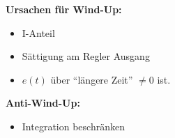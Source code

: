   \begin{multicols}{2}
    \textbf{Ursachen für Wind-Up:}
    \begin{itemize}[leftmargin=*]
      \item I-Anteil
      \item Sättigung am Regler Ausgang
      \item $e(t)$ über "`längere Zeit"' $\neq 0$ ist.
    \end{itemize}
  
  \columnbreak
    
    \textbf{Anti-Wind-Up:}
    \begin{itemize}[leftmargin=*]
      \item Integration beschränken
    \end{itemize}
  
  
  \end{multicols}
  
  

